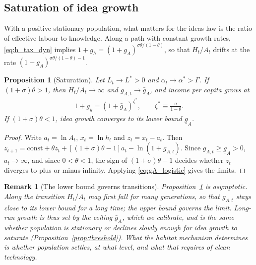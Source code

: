 \documentclass[11pt]{article}
\newtheorem{proposition}{Proposition}
\newtheorem{remark}{Remark}
\begin{document}
\subsection{Saturation of idea growth}
With a positive stationary population, what matters for the ideas law is the ratio of effective labour
to knowledge. Along a path with constant growth rates, \eqref{eq:h_tax_dyn} implies
$1+g_h=(1+g_A)^{\sigma\theta/(1-\theta)}$, so that $H_t/A_t$ drifts at the rate
$(1+g_A)^{\sigma\theta/(1-\theta)-1}$.

\begin{proposition}[Saturation]
\label{prop:saturation}
Let $L_t\to L^\ast>0$ and $\alpha_t\to\alpha^\ast>\Gamma$. If $(1+\sigma)\theta>1$, then $H_t/A_t\to\infty$
and $g_{A,t}\to\bar g_A$, and income per capita grows at
\begin{align}
1+g_y=(1+\bar g_A)^{\zeta^\ast},
\qquad \zeta^\ast\equiv\frac{\sigma}{1-\theta}.
\label{eq:limits_saturated}
\end{align}
If $(1+\sigma)\theta<1$, idea growth converges to its lower bound $\underline g_A$.
\end{proposition}

\begin{proof}
Write $a_t=\ln A_t$, $x_t=\ln h_t$ and $z_t=x_t-a_t$. Then
$z_{t+1}=\text{const}+\theta z_t+[(1+\sigma)\theta-1]a_t-\ln(1+g_{A,t})$. Since $g_{A,t}\ge\underline g_A>0$,
$a_t\to\infty$, and since $0<\theta<1$, the sign of $(1+\sigma)\theta-1$ decides whether $z_t$ diverges to
plus or minus infinity. Applying \eqref{eq:gA_logistic} gives the limits.
\end{proof}

\begin{remark}[The lower bound governs transitions]
\label{rem:transition}
Proposition~\ref{prop:saturation} is asymptotic. Along the transition $H_t/A_t$ may first fall for many
generations, so that $g_{A,t}$ stays close to its lower bound for a long time; the upper bound governs
the limit. Long-run growth is thus set by the ceiling $\bar g_A$, which we calibrate, and is the same
whether population is stationary or declines slowly enough for idea growth to saturate
(Proposition~\ref{prop:threshold}). What the habitat mechanism determines is whether
population settles, at what level, and what that requires of clean technology.
\end{remark}
\end{document}
